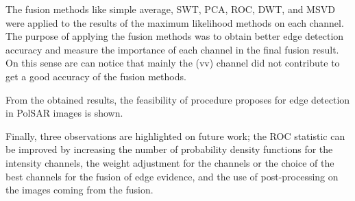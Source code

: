 \documentclass[journal]{IEEEtran}
\begin{document}
The fusion methods like simple average, SWT, PCA, ROC, DWT, and MSVD were applied to the results of the maximum likelihood methods on each channel. The purpose of applying the fusion methods was to obtain better edge detection accuracy and measure the importance of each channel in the final fusion result. On this sense are can notice that mainly the (vv) channel did not contribute to get a good accuracy of the fusion methods.

From the obtained results, the feasibility of procedure proposes for edge detection in PolSAR images is shown.

Finally, three observations are highlighted on future work; the ROC statistic can be improved by increasing the number of probability density functions for the intensity channels, the weight adjustment for the channels or the choice of the best channels for the fusion of edge evidence, and the use of post-processing on the images coming from the fusion.



\end{document}
